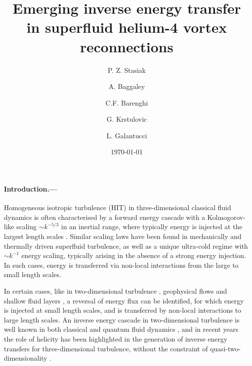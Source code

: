 \documentclass[%
 reprint,
 amsmath,amssymb,
 aps,
 prl,
]{revtex4-2}
\begin{document}

\title{Emerging inverse energy transfer in superfluid helium-4 vortex reconnections}

\author{P. Z. Stasiak}
\author{A. Baggaley}
\author{C.F. Barenghi}

\author{G. Krstulovic}

\author{L. Galantucci}

\date{\today}%

\begin{abstract}
\blindtext
\end{abstract}

\maketitle

\paragraph*{Introduction.---} Homogeneous isotropic turbulence (HIT) in three-dimensional classical fluid dynamics is often characterised by a forward energy cascade with a Kolmogorov-like scaling $\sim k^{-5/3}$ in an inertial range, where typically energy is injected at the largest length scales \cite{frisch1995}. Similar scaling laws have been found in mechanically \cite{maurer1998,baggaley2012} and thermally \cite{sherwin-robson2015} driven superfluid turbulence, as well as a unique ultra-cold regime with $\sim k^{-1}$ energy scaling, typically arising in the absence of a strong energy injection. In such cases, energy is transferred via non-local interactions from the large to small length scales.

In certain cases, like in two-dimensional turbulence \cite{kraichnan1967}, geophysical flows \cite{smith1996} and shallow fluid layers \cite{celani2010}, a reversal of energy flux can be identified, for which energy is injected at small length scales, and is transferred by non-local interactions to large length scales. An inverse energy cascade in two-dimensional turbulence is well known in both classical and quantum fluid dynamics \cite{reeves2013}, and in recent years the role of helicity has been highlighted in the generation of inverse energy transfers for three-dimensional turbulence, without the constraint of quasi-two-dimensionality \cite{chen2003,biferaleInverseEnergyCascade2012a}. 
\end{document}
